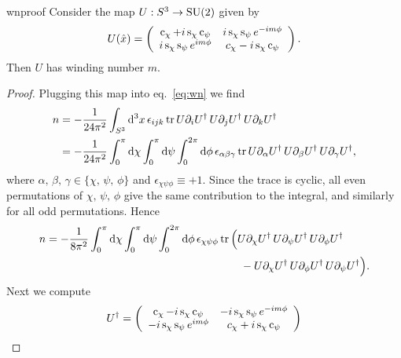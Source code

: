 \begin{proposition}{}{wnproof}
Consider the map $U:S^3\to\operatorname{SU}(2)$ given by
$$
U(\hat{x})=\left(\begin{array}{cc}
             \operatorname{c}_\chi+i\operatorname{s}_\chi\operatorname{c}_\psi     & i\operatorname{s}_\chi\operatorname{s}_\psi e^{-im\phi}\\
             i\operatorname{s}_\chi\operatorname{s}_\psi e^{im\phi}& c_\chi-i\operatorname{s}_\chi\operatorname{c}_\psi 
            \end{array}\right).
$$
Then $U$ has winding number $m$.
\begin{proof}
  Plugging this map into eq.~\eqref{eq:wn} we find
  \begin{equation*}
  \begin{aligned}
    n&=-\frac{1}{24\pi^2}\int_{S^3} \dd[3]{x}\epsilon_{ijk}\tr
        U\partial_i U^\dagger\,U\partial_j U^\dagger\,U\partial_k U^\dagger\\
     &=-\frac{1}{24\pi^2}\int_0^\pi\dd\chi\int_0^\pi\dd{\psi}\int_0^{2\pi}
        \dd{\phi}\epsilon_{\alpha\beta\gamma}\tr
        U\partial_\alpha U^\dagger\,U\partial_\beta U^\dagger\,
        U\partial_\gamma U^\dagger,\\
  \end{aligned}
  \end{equation*}
  where $\alpha,\,\beta,\,\gamma\in\{\chi,\,\psi,\,\phi\}$ and
  $\epsilon_{\chi\psi\phi}\equiv+1$.
  Since the trace is cyclic, all even permutations of $\chi,\,\psi,\,\phi$ give
  the same contribution to the integral, and similarly for all odd
  permutations. Hence
  \begin{equation*}\begin{aligned}
    n=-\frac{1}{8\pi^2}\int_0^\pi\dd{\chi}\int_0^\pi\dd\psi\int_0^{2\pi}
        \dd{\phi}\epsilon_{\chi\psi\phi}&\tr\Big(
        U\partial_\chi U^\dagger\,U\partial_\psi U^\dagger\,
        U\partial_\phi U^\dagger\\
        &~~~~~~-U\partial_\chi U^\dagger\,U\partial_\phi U^\dagger\,
        U\partial_\psi U^\dagger\Big).
  \end{aligned}\end{equation*}
  Next we compute
  \begin{equation*}
  \begin{aligned}
    U^\dagger&=\left(\begin{array}{cc}
                  \co_\chi-i\s_\chi\co_\psi & -i\s_\chi\s_\psi e^{-im\phi}\\
                 -i\s_\chi\s_\psi e^{im\phi}& c_\chi+i\s_\chi\co_\psi 
                \end{array}\right)\\

\end{aligned}
\end{equation*}
\end{proof}
\end{proposition}
